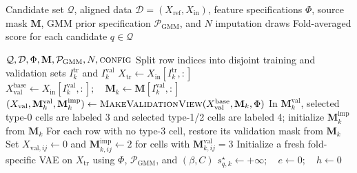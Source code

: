 \begin{algorithm}[ht]
\footnotesize
{}
\label{algo:betaC_candidate_cv}
\begin{algorithmic}[1]
\setlength{\itemsep}{0.3em}

\Require Candidate set $\mathcal Q$, aligned data $\mathcal D=(X_{\mathrm{ref}},X_{\mathrm{in}})$,
         feature specifications $\Phi$, source mask $\mathbf M$,
         GMM prior specification $\mathcal P_{\mathrm{GMM}}$,
         and $N$ imputation draws
\Ensure Fold-averaged score for each candidate $q\in\mathcal Q$

          {$\mathcal Q,\mathcal D,\Phi,\mathbf M,
            \mathcal P_{\mathrm{GMM}},N,\textsc{config}$}
      \State Split row indices into disjoint training and validation sets
             $I_k^{\mathrm{tr}}$ and $I_k^{\mathrm{val}}$
      \State $X_{\mathrm{tr}}\gets X_{\mathrm{in}}[I_k^{\mathrm{tr}},:]$
      \State $X_{\mathrm{val}}^{\mathrm{base}}\gets
             X_{\mathrm{in}}[I_k^{\mathrm{val}},:];\quad
             \mathbf M_k\gets\mathbf M[I_k^{\mathrm{val}},:]$
      \State $(X_{\mathrm{val}},\mathbf M_k^{\mathrm{val}},
             \mathbf M_k^{\mathrm{imp}})\gets
             \textsc{MakeValidationView}
             (X_{\mathrm{val}}^{\mathrm{base}},\mathbf M_k,\Phi)$
      \State In $\mathbf M_k^{\mathrm{val}}$, selected type-0 cells are labeled 3
             and selected type-1/2 cells are labeled 4; initialize
             $\mathbf M_k^{\mathrm{imp}}$ from $\mathbf M_k$
      \State For each row with no type-3 cell, restore its validation mask from
             $\mathbf M_k$
      \State Set $X_{\mathrm{val},ij}\gets0$ and
             $\mathbf M_{k,ij}^{\mathrm{imp}}\gets2$
             for cells with $\mathbf M_{k,ij}^{\mathrm{val}}=3$
      \State Initialize a fresh fold-specific VAE on $X_{\mathrm{tr}}$ using
             $\Phi$, $\mathcal P_{\mathrm{GMM}}$, and $(\beta,C)$
      \State $s_{q,k}^{\star}\gets+\infty;\quad e\gets0;\quad h\gets0$

\end{algorithmic}
\end{algorithm}
